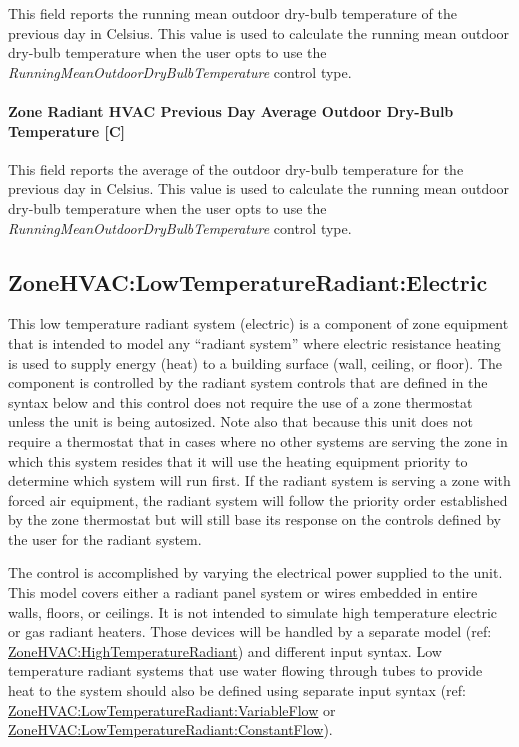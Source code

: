 This field reports the running mean outdoor dry-bulb temperature of the previous day in Celsius. This value is used to calculate the running mean outdoor dry-bulb temperature when the user opts to use the \emph{RunningMeanOutdoorDryBulbTemperature} control type.

\paragraph{Zone Radiant HVAC Previous Day Average Outdoor Dry-Bulb Temperature {[}C{]}}\label{zone-radiant-hvac-previous-day-average-outdoor-dry-bulb-temperature}

This field reports the average of the outdoor dry-bulb temperature for the previous day in Celsius. This value is used to calculate the running mean outdoor dry-bulb temperature when the user opts to use the \emph{RunningMeanOutdoorDryBulbTemperature} control type.

\subsection{ZoneHVAC:LowTemperatureRadiant:Electric}\label{zonehvaclowtemperatureradiantelectric}

This low temperature radiant system (electric) is a component of zone equipment that is intended to model any ``radiant system'' where electric resistance heating is used to supply energy (heat) to a building surface (wall, ceiling, or floor). The component is controlled by the radiant system controls that are defined in the syntax below and this control does not require the use of a zone thermostat unless the unit is being autosized. Note also that because this unit does not require a thermostat that in cases where no other systems are serving the zone in which this system resides that it will use the heating equipment priority to determine which system will run first. If the radiant system is serving a zone with forced air equipment, the radiant system will follow the priority order established by the zone thermostat but will still base its response on the controls defined by the user for the radiant system.

The control is accomplished by varying the electrical power supplied to the unit. This model covers either a radiant panel system or wires embedded in entire walls, floors, or ceilings. It is not intended to simulate high temperature electric or gas radiant heaters. Those devices will be handled by a separate model (ref: \hyperref[zonehvachightemperatureradiant]{ZoneHVAC:HighTemperatureRadiant}) and different input syntax. Low temperature radiant systems that use water flowing through tubes to provide heat to the system should also be defined using separate input syntax (ref: \hyperref[zonehvaclowtemperatureradiantvariableflow]{ZoneHVAC:LowTemperatureRadiant:VariableFlow} or \hyperref[zonehvaclowtemperatureradiantconstantflow]{ZoneHVAC:LowTemperatureRadiant:ConstantFlow}).

